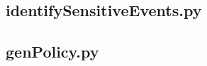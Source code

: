 \documentclass[twocolumn,10pt]{article}
\begin{document}
\lstset{style=mystyle}

\subsection*{\centering \large identifySensitiveEvents.py}


\subsection*{\centering \large genPolicy.py}

\end{document}
